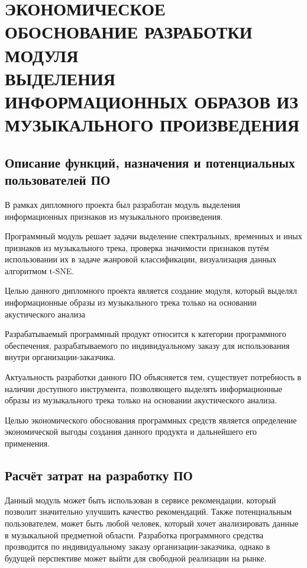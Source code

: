 \newcommand{\byr}{ руб.}

\section{ЭКОНОМИЧЕСКОЕ ОБОСНОВАНИЕ РАЗРАБОТКИ  МОДУЛЯ \\ ВЫДЕЛЕНИЯ ИНФОРМАЦИОННЫХ ОБРАЗОВ ИЗ МУЗЫКАЛЬНОГО ПРОИЗВЕДЕНИЯ}
\label{sec:econ}

\subsection{Описание функций, назначения и потенциальных пользователей ПО}
\label{sub:econ:overview_appointment}
В рамках дипломного проекта был разработан модуль выделения информационных признаков из музыкального произведения.

Программный модуль решает задачи выделение спектральных, временных и иных признаков из музыкального трека, проверка значимости признаков путём использовании их в задаче жанровой классификации, визуализация данных алгоритмом t-SNE.

Целью данного дипломного проекта является создание  модуля, который выделял информационные образы из музыкального трека только на основании  акустического анализа

Разрабатываемый программный продукт относится к категории программного обеспечения, разрабатываемого по индивидуальному заказу для использования внутри организации-заказчика.

Актуальность разработки данного ПО объясняется тем, существует потребность в наличии доступного инструмента, позволяющего выделять информационные образы из музыкального трека только на основании  акустического анализа.

Целью экономического обоснования программных средств является определение экономической выгоды создания данного продукта и дальнейшего его применения.

\subsection{Расчёт затрат на разработку ПО}
\label{sub:econ:expenses}


Данный модуль может быть использован в сервисе рекомендации, который позволит значительно улучшить качество рекомендаций. Также потенциальным пользователем, может быть любой человек, который хочет анализировать данные в музыкальной предметной области. Разработка программного средства прозводится по индивидуальному заказу организации-заказчика, однако в будущей перспективе может выйти для свободной реализации на рынке.

